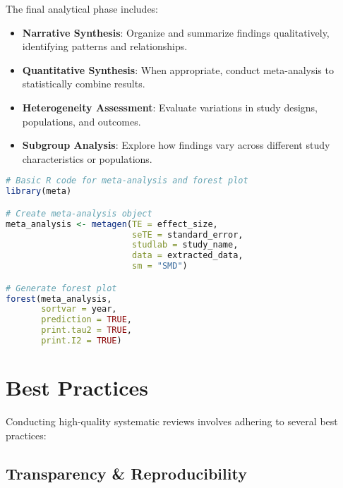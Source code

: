 The final analytical phase includes:

\begin{itemize}
    \item \textbf{Narrative Synthesis}: Organize and summarize findings qualitatively, identifying patterns and relationships.
    \item \textbf{Quantitative Synthesis}: When appropriate, conduct meta-analysis to statistically combine results.
    \item \textbf{Heterogeneity Assessment}: Evaluate variations in study designs, populations, and outcomes.
    \item \textbf{Subgroup Analysis}: Explore how findings vary across different study characteristics or populations.
\end{itemize}
\begin{commandbox}
\begin{lstlisting}[language=R]
# Basic R code for meta-analysis and forest plot
library(meta)

# Create meta-analysis object
meta_analysis <- metagen(TE = effect_size,
                         seTE = standard_error,
                         studlab = study_name,
                         data = extracted_data,
                         sm = "SMD")

# Generate forest plot
forest(meta_analysis,
       sortvar = year,
       prediction = TRUE,
       print.tau2 = TRUE,
       print.I2 = TRUE)
\end{lstlisting}
\end{commandbox}

\section{Best Practices}

Conducting high-quality systematic reviews involves adhering to several best practices:

\subsection{Transparency \& Reproducibility}

